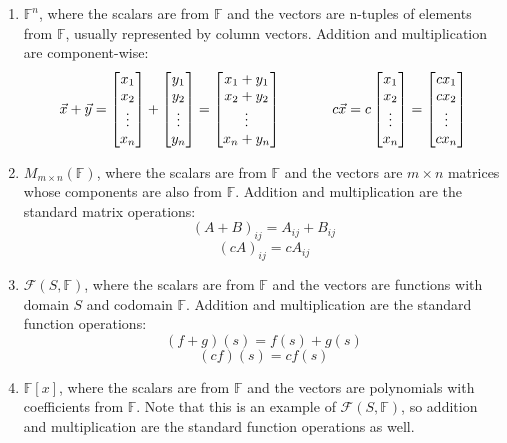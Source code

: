 \documentclass[letterpaper,12pt,fleqn]{article}
\newcommand{\vx}{\vec{x}}
\newcommand{\vy}{\vec{y}}
\newcommand{\F}{\mathbb{F}}
\begin{document}
\begin{example}
  \listbreak
  \begin{enumerate}
  \item $\F^n$, where the scalars are from $\F$ and the vectors are n-tuples of
    elements from $\F$, usually represented by column vectors. Addition and
    multiplication are component-wise:
    \[\vx+\vy=\begin{bmatrix}x_1 \\ x_2 \\ \vdots \\ x_n\end{bmatrix}+
    \begin{bmatrix}y_1 \\ y_2 \\ \vdots \\ y_n\end{bmatrix}=
      \begin{bmatrix}x_1+y_1 \\ x_2+y_2 \\ \vdots \\ x_n+y_n\end{bmatrix}\hspace{0.5in}
        c\vx=c\begin{bmatrix}x_1 \\ x_2 \\ \vdots \\ x_n\end{bmatrix}=
        \begin{bmatrix}cx_1 \\ cx_2 \\ \vdots \\ cx_n\end{bmatrix}\]
\newpage
  \item $M_{m\times n}(\F)$, where the scalars are from $\F$ and the vectors are
    $m\times n$ matrices whose components are also from $\F$. Addition and multiplication
    are the standard matrix operations:
    \[(A+B)_{ij}=A_{ij}+B_{ij}\]
    \[(cA)_{ij}=cA_{ij}\]

  \item $\mathcal{F}(S,\F)$, where the scalars are from $\F$ and the vectors are
    functions with domain $S$ and codomain $\F$. Addition and multiplication are the
    standard function operations:
    \[(f+g)(s)=f(s)+g(s)\]
    \[(cf)(s)=cf(s)\]

  \item $\F[x]$, where the scalars are from $\F$ and the vectors are polynomials with
    coefficients from $\F$. Note that this is an example of $\mathcal{F}(S,\F)$, so
    addition and multiplication are the standard function operations as well.
  \end{enumerate}
\end{example}
\end{document}
